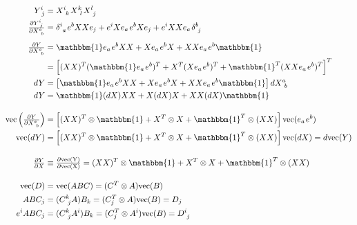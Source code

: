 \documentclass[12pt]{article}
\newcommand{\hs}{\hspace{1pt}} %
\begin{document}
\vspace{15pt}
\(\begin{aligned}
	Y^i_{\ j} & = X^i_{\ k}\hs X^k_{\ l}\hs X^l_{\ j}\\
	\tfrac{\partial Y^i_{\ j}}{\partial X^a_{\ b}} & = 
		\delta^i_{\ a} \hs e^b X X e_j + e^i X e_a \hs e^b X e_j + e^i X X e_a \hs \delta^b_{\ j}
		\\[5pt]
	\tfrac{\partial Y}{\partial X^a_{\ b}} & 
		= \mathbbm{1} e_a \hs e^b X X + X e_a \hs e^b X  + X X e_a \hs e^b \mathbbm{1}
		\\
	& = \left[ 
		(XX)^T (\mathbbm{1} e_a \hs e^b)^T + X^T (X e_a \hs e^b)^T + \mathbbm{1}^T (X X e_a \hs e^b)^T
		\right]^T
		\\
	dY & = \left[ \mathbbm{1} e_a \hs e^b X X + X e_a \hs e^b X  + X X e_a \hs e^b \mathbbm{1} \right] dX^a_{\ b}
		\\
	dY & = \mathbbm{1} (dX) XX + X(dX) X + XX(dX)\mathbbm{1} 
		\\[10pt]
	\text{vec} \left( \tfrac{\partial Y}{\partial X^a_{\ b}} \right) &
		= \left[ 
			(XX)^T \otimes \mathbbm{1}  + X^T \otimes X  + \mathbbm{1}^T \otimes (XX) 
		\right] 
		\text{vec}(e_a \hs e^b)
		\\
	\text{vec}(dY) & = \left[ 
			(XX)^T \otimes \mathbbm{1} + X^T \otimes X + \mathbbm{1}^T \otimes (XX)
		\right] 
		\text{vec}(dX)
		= d\text{vec}(Y)
		\\[10pt]
	\tfrac{\partial Y}{\partial X} & \equiv \tfrac{\partial \text{vec(Y)}}{\partial \text{vec(X)}}
		= (XX)^T \otimes \mathbbm{1} + X^T \otimes X + \mathbbm{1}^T \otimes (XX) 
		\\[10pt]
	\text{vec}(D) & = \text{vec}(ABC) = (C^T \otimes A) \text{vec}(B)  \\
	A B C_j & = (C^k_{\ j} A) B_k = (C_j^T \otimes A) \text{vec}(B) = D_j\\
	e^i ABC_j& = (C^k_{\ j} A^i) B_k = (C_j^T \otimes A^i) \text{vec}(B) = D^i_{\ j} \\
\end{aligned}\)
\end{document}
